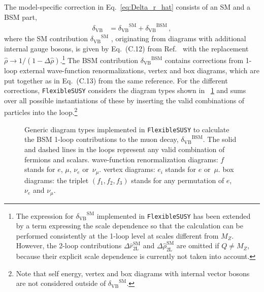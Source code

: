 \documentclass[final,3p,11pt,pdflatex]{elsarticle}
\makeatletter
\newcommand{\fs}{\texttt{FlexibleSUSY}\@\xspace}
\newcommand{\SM}{\ensuremath{\text{SM}}\xspace}
\newcommand{\BSM}{\ensuremath{\text{BSM}}\xspace}
\newcommand{\deltaVB}{\ensuremath{\delta_{\text{VB}}}\xspace}
\newcommand{\figref}[1]{\figurename~\ref{#1}}
\makeatother
\begin{document}
The model-specific correction in Eq.~\eqref{eq:Delta_r_hat}
consists of an SM and a BSM part,
%
\begin{align}
   \deltaVB &= \deltaVB^\SM + \deltaVB^\BSM\,,
\end{align}
%
where the SM contribution $\deltaVB^\SM$
\cite{Degrassi:1990tu}, originating
from diagrams with additional internal gauge bosons, is given by
Eq.~(C.12) from Ref.~\cite{Pierce:1996zz} with the replacement
$\hat\rho \rightarrow 1/(1-\Delta\hat\rho)$.\footnote{The expression
  for $\deltaVB^\SM$ implemented in \fs has been extended by a term
  expressing the scale dependence so that the calculation can be
  performed consistently at the 1-loop level at scales different from
  $M_Z$.  However, the 2-loop contributions
  $\Delta\hat{r}_\text{2L}^\SM$ and $\Delta\hat\rho_\text{2L}^\SM$ are
  omitted if $Q \neq M_Z$, because their explicit scale dependence is
  currently not taken into account.}
The BSM contribution $\deltaVB^\BSM$ contains corrections from
1-loop external wave-function renormalizations, vertex and
box diagrams, which are put together as in Eq.~(C.13) from the
same reference. For the different corrections, \fs considers the
diagram types shown in \figref{fig:delta_VB_diagram_types} and sums
over all possible instantiations of these by inserting the valid
combinations of particles into the loop.\footnote{ Note that
self energy, vertex and box diagrams with internal vector bosons
are not considered outside of $\deltaVB^\SM$.}
%
\begin{figure}[tbh]
  \centering
  \caption{Generic diagram types implemented in \fs to calculate
  the BSM 1-loop contributions to the muon decay, $\deltaVB^\BSM$.
  The solid and dashed lines in the loops represent any valid
  combination of fermions and scalars.
  \protect{} wave-function
  renormalization diagrams: $f$ stands for $e$, $\mu$, $\nu_e$
  or~$\nu_\mu$.
  \protect{} vertex diagrams:
  $e_i$ stands for $e$ or~$\mu$.
  \protect{} box diagrams:
  the triplet $(f_1, f_2, f_3)$ stands for any permutation of
  $e$, $\nu_e$ and $\nu_\mu$.}
  \label{fig:delta_VB_diagram_types}
\end{figure}
%
\end{document}
